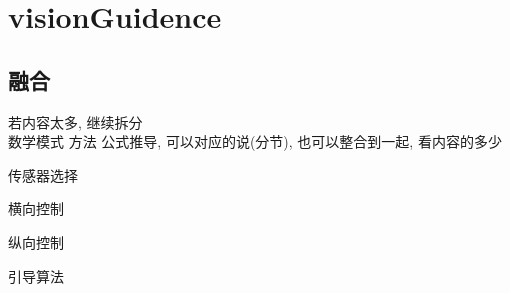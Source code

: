    \chapter{visionGuidence}
    
    \section{融合}
    若内容太多, 继续拆分 \\
    数学模式 方法 公式推导, 可以对应的说(分节), 也可以整合到一起, 看内容的多少
    \par 传感器选择
    \par 横向控制
    \par 纵向控制
    \par 引导算法